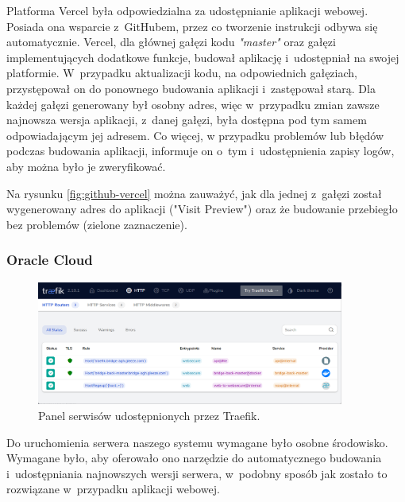 Platforma Vercel\cite{Vercel} była odpowiedzialna za
udostępnianie aplikacji webowej. Posiada ona wsparcie \mbox{z~GitHubem},
przez co tworzenie instrukcji odbywa się automatycznie.
Vercel, dla głównej gałęzi kodu \textit{"master"} oraz
gałęzi implementujących dodatkowe funkcje, budował aplikację
i~udostępniał na swojej platformie. W~przypadku aktualizacji
kodu, na odpowiednich gałęziach, przystępował on do ponownego
budowania aplikacji i~zastępował starą. Dla każdej gałęzi
generowany był osobny adres, więc w~przypadku zmian zawsze
najnowsza wersja aplikacji, z~danej gałęzi, była dostępna pod
tym samem odpowiadającym jej adresem. Co więcej, w przypadku
problemów lub błędów podczas budowania aplikacji, informuje
on o~tym i~udostępnienia zapisy logów, aby można było je
zweryfikować.

Na rysunku
\ref{fig:github-vercel} można zauważyć, jak dla jednej
z~gałęzi został wygenerowany adres do aplikacji
("Visit Preview") oraz że budowanie przebiegło bez problemów
(zielone zaznaczenie).

\FloatBarrier


\subsubsection{Oracle Cloud}

\begin{figure}[!]
    \centering
    \includegraphics[width=0.9\textwidth]{img/traefik/dashboard.png}
    \caption{Panel serwisów udostępnionych przez Traefik.}
    \label{fig:traefik-dashboard}
\end{figure}

Do uruchomienia serwera naszego systemu wymagane było
osobne środowisko. Wymagane było, aby oferowało ono
narzędzie do automatycznego budowania i~udostępniania
najnowszych wersji serwera, w~podobny sposób jak zostało
to rozwiązane w~przypadku aplikacji webowej.

